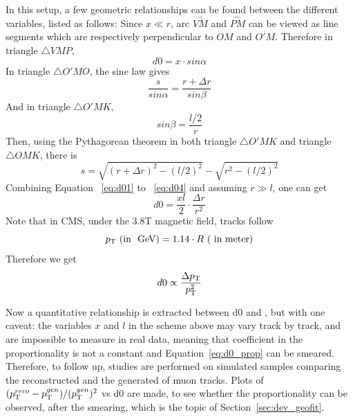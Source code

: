 In this setup, a few geometric relationships can be found between the different variables, listed as follows:
Since $x \ll r$, arc $\stackrel{\frown}{VM}$ and $\stackrel{\frown}{PM}$ can be viewed as line segments which are respectively perpendicular to $OM$ and $O'M$.
Therefore in triangle $\triangle VMP$, 
\begin{equation}\label{eq:d01}
      d0 = x \cdot sin\alpha
\end{equation}      
In triangle $\triangle O'MO$, the sine law gives
\begin{equation}\label{eq:d02}
      \frac{s}{sin\alpha} = \frac{r+\Delta{}r}{sin\beta}
\end{equation}
And in triangle $\triangle O'MK$, 
\begin{equation}\label{eq:d03}
      sin\beta = \frac{l/2}{r}
\end{equation}   
Then, using the Pythagorean theorem in both triangle $\triangle O'MK$ and triangle $\triangle OMK$, there is
\begin{equation}\label{eq:d04}
      s =  \sqrt{(r+\Delta{}r)^{2} - (l/2)^{2}} - \sqrt{r^{2} - (l/2)^{2}}
\end{equation}   
Combining Equation ~\ref{eq:d01} to ~\ref{eq:d04} and assuming $r \gg l$, one can get
\begin{equation}\label{eq:d05}
      d0 = \frac{xl}{2} \cdot \frac{\Delta{}r}{r^{2}}
\end{equation}  
Note that in CMS, under the 3.8T magnetic field, tracks follow 
\begin{equation}
    p_{\mathrm{T}} ~(\text{in ~\ensuremath{\mbox{GeV}}}) = 1.14 \cdot R ~(~\text{in meter})   
\end{equation}
Therefore we get
\begin{equation}\label{eq:d0_prop}
    d0 \propto \frac{\Delta{}p_{\mathrm{T}}}{p_{\mathrm{T}}^{2}}
\end{equation}

Now a quantitative relationship is extracted between d0 and \pt, but with one caveat:
the variables $x$ and $l$ in the scheme above may vary track by track, and are impossible to measure in real data,
meaning that coefficient in the proportionality is not a constant and Equation~\ref{eq:d0_prop} can be smeared.
Therefore, to follow up, studies are performed on simulated samples comparing the reconstructed \pt and the generated \pt of muon tracks.
Plots of $(p_{\mathrm{T}}^{reco}-p_{\mathrm{T}}^{gen})/ (p_{\mathrm{T}}^{gen})^{2}$ vs d0 are made, 
to see whether the proportionality can be observed, after the smearing,
which is the topic of Section~\ref{sec:dev_geofit}.

